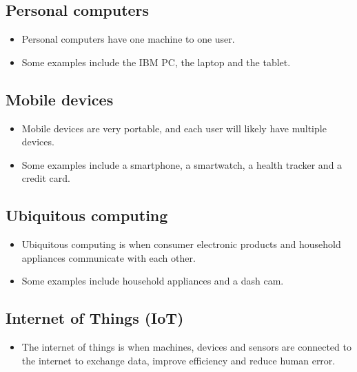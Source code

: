 \documentclass[11pt]{article}
\begin{document}
\subsection{Personal computers}
\label{sec:orgeb8efa2}
\begin{itemize}
\item Personal computers have one machine to one user.
\item Some examples include the IBM PC, the laptop and the tablet.
\end{itemize}

\subsection{Mobile devices}
\label{sec:org6d54c0a}
\begin{itemize}
\item Mobile devices are very portable, and each user will likely have multiple devices.
\item Some examples include a smartphone, a smartwatch, a health tracker and a credit card.
\end{itemize}

\subsection{Ubiquitous computing}
\label{sec:org4657b8a}
\begin{itemize}
\item Ubiquitous computing is when consumer electronic products and household appliances communicate with each other.
\item Some examples include household appliances and a dash cam.
\end{itemize}

\subsection{Internet of Things (IoT)}
\label{sec:org62a58ba}
\begin{itemize}
\item The internet of things is when machines, devices and sensors are connected to the internet to exchange data, improve efficiency and reduce human error.
\end{itemize}
\end{document}

